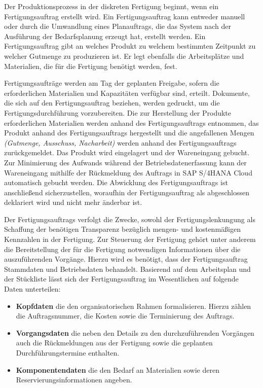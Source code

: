 Der Produktionsprozess in der diskreten Fertigung beginnt, wenn ein Fertigungsauftrag erstellt wird. 
Ein Fertigungsauftrag kann entweder manuell oder durch die Umwandlung eines Planauftrags, die das System nach der Ausführung der Bedarfsplanung erzeugt hat, erstellt werden. 
Ein Fertigungsauftrag gibt an welches Produkt zu welchem bestimmten Zeitpunkt zu welcher Gutmenge zu produzieren ist. 
Er legt ebenfalls die Arbeitsplätze und Materialien, die für die Fertigung benötigt werden, fest. 
\cite{Dickersbach.2014}

Fertigungsaufträge werden am Tag der geplanten Freigabe, sofern die erforderlichen Materialien und Kapazitäten verfügbar sind, erteilt. 
Dokumente, die sich auf den Fertigungsauftrag beziehen, werden gedruckt, um die Fertigungsdurchführung vorzubereiten. 
Die zur Herstellung der Produkte erforderlichen Materialien werden anhand des Fertigungsauftrags entnommen, das Produkt anhand des Fertigungsauftrags hergestellt und die angefallenen Mengen \textit{(Gutmenge, Ausschuss, Nacharbeit)} werden anhand des Fertigungsauftrags zurückgemeldet.
Das Produkt wird eingelagert und der Wareneingang gebucht. 
Zur Minimierung des Aufwands während der Betriebsdatenerfassung kann der Wareneingang mithilfe der Rückmeldung des Auftrags in SAP S/4HANA Cloud automatisch gebucht werden.
Die Abwicklung des Fertigungsauftrags ist anschließend sicherzustellen, woraufhin der Fertigungsauftrag als abgeschlossen deklariert wird und nicht mehr änderbar ist.
\cite{Dickersbach.2014}


Der Fertigungsauftrags verfolgt die Zwecke, sowohl der Fertigungslenkungung als Schaffung der benötigen Transparenz bezüglich mengen- und kostenmäßigen Kennzahlen in der Fertigung. Zur Steuerung der Fertigung gehört unter anderem die Bereitstellung der für die Fertigung notwendigen Informationen über die auszuführenden Vorgänge. Hierzu wird es benötigt, dass der Fertigungsauftrag Stammdaten und Betriebsdaten behandelt. Basierend auf dem Arbeitsplan und der Stückliste lässt sich der Fertigungsauftrag im Wesentlichen auf folgende Daten unterteilen:

\begin{itemize}
    \item \textbf{Kopfdaten} die den organisatorischen Rahmen formalisieren. Hierzu zählen die Auftragsnummer, die Kosten sowie die Terminierung des Auftrags.
    \item \textbf{Vorgangsdaten} die neben den Details zu den durchzuführenden Vorgängen auch die Rückmeldungen aus der Fertigung sowie die geplanten Durchführungstermine enthalten.
    \item \textbf{Komponentendaten} die den Bedarf an Materialien sowie deren Reservierungsinformationen angeben.
\end{itemize}

